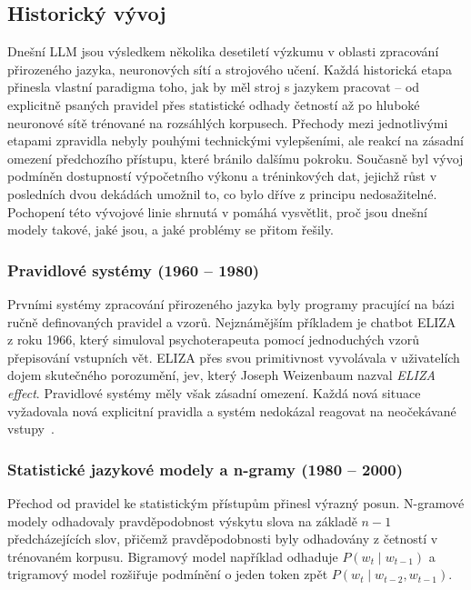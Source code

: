 \subsection{Historický vývoj}
\label{subsec:llm-history}

Dnešní LLM jsou výsledkem několika desetiletí výzkumu v oblasti zpracování přirozeného jazyka, neuronových sítí a strojového učení.
Každá historická etapa přinesla vlastní paradigma toho, jak by měl stroj s jazykem pracovat -- od explicitně psaných pravidel přes statistické odhady četností až po hluboké neuronové sítě trénované na rozsáhlých korpusech.
Přechody mezi jednotlivými etapami zpravidla nebyly pouhými technickými vylepšeními, ale reakcí na zásadní omezení předchozího přístupu, které bránilo dalšímu pokroku.
Současně byl vývoj podmíněn dostupností výpočetního výkonu a tréninkových dat, jejichž růst v posledních dvou dekádách umožnil to, co bylo dříve z principu nedosažitelné.
Pochopení této vývojové linie shrnutá v  pomáhá vysvětlit, proč jsou dnešní modely takové, jaké jsou, a jaké problémy se přitom řešily.

\subsubsection*{Pravidlové systémy (1960 -- 1980)}
\label{subsubsec:llm-history-rules}

Prvními systémy zpracování přirozeného jazyka byly programy pracující na bázi ručně definovaných pravidel a vzorů.
Nejznámějším příkladem je chatbot ELIZA z roku 1966, který simuloval psychoterapeuta pomocí jednoduchých vzorů přepisování vstupních vět.
ELIZA přes svou primitivnost vyvolávala v uživatelích dojem skutečného porozumění, jev, který Joseph Weizenbaum nazval \textit{ELIZA effect}.
Pravidlové systémy měly však zásadní omezení.
Každá nová situace vyžadovala nová explicitní pravidla a systém nedokázal reagovat na neočekávané vstupy~\cite{weizenbaum-eliza}.

\subsubsection*{Statistické jazykové modely a n-gramy (1980 -- 2000)}
\label{subsubsec:llm-history-statistical}

Přechod od pravidel ke statistickým přístupům přinesl výrazný posun.
N-gramové modely odhadovaly pravděpodobnost výskytu slova na základě $n-1$ předcházejících slov, přičemž pravděpodobnosti byly odhadovány z četností v trénovaném korpusu.
Bigramový model například odhaduje $P(w_t \mid w_{t-1})$ a trigramový model rozšiřuje podmínění o jeden token zpět $P(w_t \mid w_{t-2}, w_{t-1})$.

